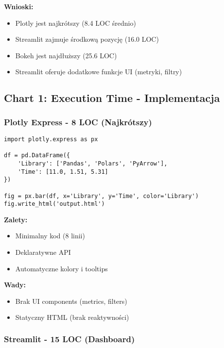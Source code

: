 \documentclass[a4paper,11pt]{article}
\begin{document}
\textbf{Wnioski:}
\begin{itemize}
    \item Plotly jest najkrótszy (8.4 LOC średnio)
    \item Streamlit zajmuje środkową pozycję (16.0 LOC)
    \item Bokeh jest najdłuższy (25.6 LOC)
    \item Streamlit oferuje dodatkowe funkcje UI (metryki, filtry)
\end{itemize}

\newpage
\subsection{Chart 1: Execution Time - Implementacja}

\subsubsection{Plotly Express - 8 LOC (Najkrótszy)}

\begin{lstlisting}[caption={Plotly Express - Prosty wykres słupkowy},label={lst:plotly_chart1}]
import plotly.express as px

df = pd.DataFrame({
    'Library': ['Pandas', 'Polars', 'PyArrow'],
    'Time': [11.0, 1.51, 5.31]
})

fig = px.bar(df, x='Library', y='Time', color='Library')
fig.write_html('output.html')
\end{lstlisting}

\textbf{Zalety:}
\begin{itemize}
    \item Minimalny kod (8 linii)
    \item Deklaratywne API
    \item Automatyczne kolory i tooltips
\end{itemize}

\textbf{Wady:}
\begin{itemize}
    \item Brak UI components (metrics, filters)
    \item Statyczny HTML (brak reaktywności)
\end{itemize}

\subsubsection{Streamlit - 15 LOC (Dashboard)}
\end{document}
